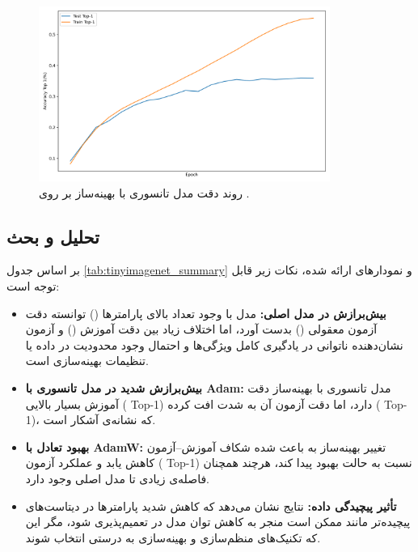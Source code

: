 \begin{figure}[ht]
	\centering
	\includegraphics[width=0.85\textwidth]{transformer_images/results/tiny_image_net_tensorized.png}
	\caption{روند دقت  مدل تانسوری با بهینه‌ساز  بر روی .}
	\label{fig:tiny_tensor_adamw}
\end{figure}

\subsection{تحلیل و بحث}

بر اساس جدول \ref{tab:tinyimagenet_summary} و نمودارهای ارائه شده، نکات زیر قابل توجه است:
\begin{itemize}
	\item \textbf{بیش‌برازش در مدل اصلی:} مدل  با وجود تعداد بالای پارامترها () توانسته دقت آزمون  معقولی () بدست آورد، اما اختلاف زیاد بین دقت آموزش () و آزمون نشان‌دهنده ناتوانی در یادگیری کامل ویژگی‌ها و احتمال وجود محدودیت در داده یا تنظیمات بهینه‌سازی است.
	\item \textbf{بیش‌برازش شدید در مدل تانسوری با Adam:} مدل تانسوری با بهینه‌ساز  دقت آموزش بسیار بالایی ( Top-1) دارد، اما دقت آزمون آن به شدت افت کرده ( Top-1)، که نشانه‌ی آشکار  است.
	\item \textbf{بهبود تعادل با AdamW:} تغییر بهینه‌ساز به  باعث شده شکاف آموزش–آزمون کاهش یابد و عملکرد آزمون ( Top-1) نسبت به حالت  بهبود پیدا کند، هرچند همچنان فاصله‌ی زیادی تا مدل اصلی وجود دارد.
	\item \textbf{تأثیر پیچیدگی داده:} نتایج نشان می‌دهد که کاهش شدید پارامترها در دیتاست‌های پیچیده‌تر مانند  ممکن است منجر به کاهش توان مدل در تعمیم‌پذیری شود، مگر این که تکنیک‌های منظم‌سازی و بهینه‌سازی به درستی انتخاب شوند.
\end{itemize}

